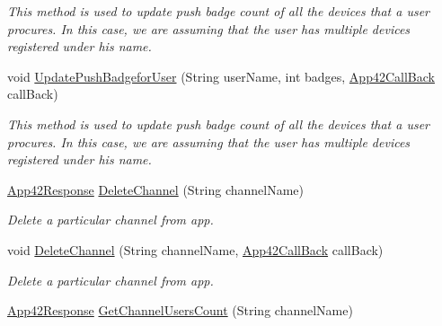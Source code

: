 \begin{DoxyCompactItemize}
\begin{DoxyCompactList}\small\item\em This method is used to update push badge count of all the devices that a user procures. In this case, we are assuming that the user has multiple devices registered under his name. \end{DoxyCompactList}\item 
void \hyperlink{classcom_1_1shephertz_1_1app42_1_1paas_1_1sdk_1_1csharp_1_1push_notification_1_1_push_notification_service_a5640b095c350c28a9d5e786e60bffb7c}{Update\+Push\+Badgefor\+User} (String user\+Name, int badges, \hyperlink{interfacecom_1_1shephertz_1_1app42_1_1paas_1_1sdk_1_1csharp_1_1_app42_call_back}{App42\+Call\+Back} call\+Back)
\begin{DoxyCompactList}\small\item\em This method is used to update push badge count of all the devices that a user procures. In this case, we are assuming that the user has multiple devices registered under his name. \end{DoxyCompactList}\item 
\hyperlink{classcom_1_1shephertz_1_1app42_1_1paas_1_1sdk_1_1csharp_1_1_app42_response}{App42\+Response} \hyperlink{classcom_1_1shephertz_1_1app42_1_1paas_1_1sdk_1_1csharp_1_1push_notification_1_1_push_notification_service_a7f189f19359b6c6381aeff82a302ed6d}{Delete\+Channel} (String channel\+Name)
\begin{DoxyCompactList}\small\item\em Delete a particular channel from app. \end{DoxyCompactList}\item 
void \hyperlink{classcom_1_1shephertz_1_1app42_1_1paas_1_1sdk_1_1csharp_1_1push_notification_1_1_push_notification_service_a3c7157cea66979eab6222c605598ba95}{Delete\+Channel} (String channel\+Name, \hyperlink{interfacecom_1_1shephertz_1_1app42_1_1paas_1_1sdk_1_1csharp_1_1_app42_call_back}{App42\+Call\+Back} call\+Back)
\begin{DoxyCompactList}\small\item\em Delete a particular channel from app. \end{DoxyCompactList}\item 
\hyperlink{classcom_1_1shephertz_1_1app42_1_1paas_1_1sdk_1_1csharp_1_1_app42_response}{App42\+Response} \hyperlink{classcom_1_1shephertz_1_1app42_1_1paas_1_1sdk_1_1csharp_1_1push_notification_1_1_push_notification_service_ab1d5b8ba08ec29ecf2b16aa6f3efe434}{Get\+Channel\+Users\+Count} (String channel\+Name)

\end{DoxyCompactItemize}
